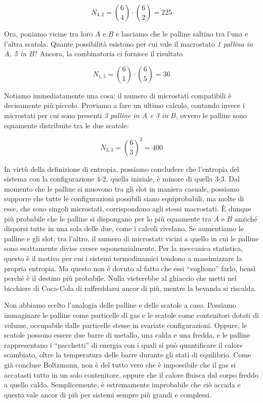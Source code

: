 \[ N_{4,2} = \binom{6}{4} \cdot \binom{6}{2} = 225 \]

Ora, poniamo vicine tra loro $A$ e $B$ e lasciamo che le palline
saltino tra l'una e l'altra scatola. Quante possibilità esistono
per cui vale il macrostato \textit{1 pallina in $A$, 5 in $B$}?
Ancora, la combinatoria ci fornisce il risultato

\[ N_{1,5} = \binom{6}{1} \cdot \binom{6}{5} = 36 \]

\noindent Notiamo immediatamente una cosa: il numero di microstati
compatibili è decisamente più piccolo. Proviamo a fare un ultimo
calcolo, contando invece i microstati per cui sono presenti
\textit{3 palline in $A$ e 3 in $B$}, ovvero le palline sono
equamente distribuite tra le due scatole:

\[ N_{3,3} =\binom{6}{3}^2 = 400 \]

In virtù della definizione di entropia, possiamo concludere che
l'entropia del sistema con la configurazione 4-2, quella iniziale,
è minore di quella 3-3.
Dal momento che le palline si muovono tra gli slot in maniera
casuale, possiamo supporre che tutte le configurazioni possibili
siano equiprobabili, ma molte di esse, che sono singoli microstati,
corrispondono agli stessi macrostati. È dunque più probabile che
le palline si dispongano per lo più equamente tra $A$ e $B$
anziché disporsi tutte in una sola delle due, come i calcoli
rivelano. Se aumentiamo
le palline e gli slot, tra l'altro, il numero di microstati
vicini a quello in cui le palline sono esattamente divise
cresce esponenzialmente. Per la meccanica statistica, questo
è il motivo per cui i sistemi termodinamici tendono a massimizzare
la propria entropia. Ma questo non è dovuto al fatto che essi
``vogliono'' farlo, bensì perché è il destino più probabile.
Nulla vieterebbe al ghiaccio che metti nel bicchiere di Coca-Cola
di raffreddarsi ancor di più, mentre la bevanda si riscalda.

Non abbiamo scelto l'analogia delle palline e delle scatole a caso.
Possiamo immaginare le palline come particelle di gas e le scatole
come contenitori dotati di volume, occupabile dalle particelle stesse
in svariate configurazioni. Oppure, le scatole possono essere
due barre di metallo, una calda e una fredda, e le palline
rappresentano i ``pacchetti'' di energia con i quali si può
quantificare il calore scambiato, oltre la temperatura delle barre durante
gli stati di equilibrio. Come già concluse Boltzmann, non è
del tutto vero che è impossibile che il gas si accatasti
tutto in un solo contenitore, oppure che il calore fluisca
dal corpo freddo a quello caldo. Semplicemente, è estremamente
improbabile che ciò accada e questo vale ancor di più per sistemi
sempre più grandi e complessi.

